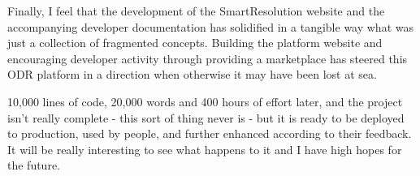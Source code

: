 Finally, I feel that the development of the SmartResolution website and the accompanying developer documentation has solidified in a tangible way what was just a collection of fragmented concepts. Building the platform website and encouraging developer activity through providing a marketplace has steered this ODR platform in a direction when otherwise it may have been lost at sea.

10,000 lines of code, 20,000 words and 400 hours of effort later, and the project isn't really complete - this sort of thing never is - but it is ready to be deployed to production, used by people, and further enhanced according to their feedback. It will be really interesting to see what happens to it and I have high hopes for the future.
